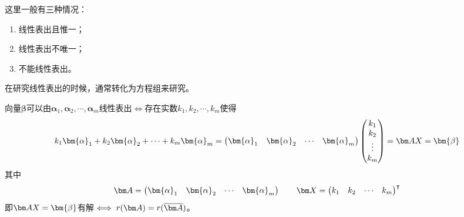 这里一般有三种情况：
\begin{enumerate}[(1)]
    \item 线性表出且惟一；
    \item 线性表出不唯一；
    \item 不能线性表出。
\end{enumerate}
在研究线性表出的时候，通常转化为方程组来研究。
\begin{theorem}
    向量$\bm{\beta}$可以由$\bm{\alpha}_1,\bm{\alpha}_2,\cdots,\bm{\alpha}_m$线性表出$\iff$存在实数$k_1,k_2,\cdots,k_m$使得
    \[
        k_1\bm{\alpha}_1 + k_2\bm{\alpha}_2 +\cdots + k_m\bm{\alpha}_m =
        \begin{pmatrix}
            \bm{\alpha}_1 & \bm{\alpha}_2 & \cdots & \bm{\alpha}_m
        \end{pmatrix}
        \begin{pmatrix}
            k_1 \\k_2\\\vdots\\k_m
        \end{pmatrix}
        =\mat{AX}=
        \bm{\beta}
    \]
    其中
    \[
        \mat{A} =
        \begin{pmatrix}
            \bm{\alpha}_1 & \bm{\alpha}_2 & \cdots & \bm{\alpha}_m
        \end{pmatrix}
        \qquad
        \mat{X} =
        \begin{pmatrix}
            k_1 & k_2 & \cdots & k_m
        \end{pmatrix}^\intercal
    \]
    即$\mat{AX}=\bm{\beta}$有解$\iff r(\mat{A})=r(\overline{\mat{A}})$。
\end{theorem}

